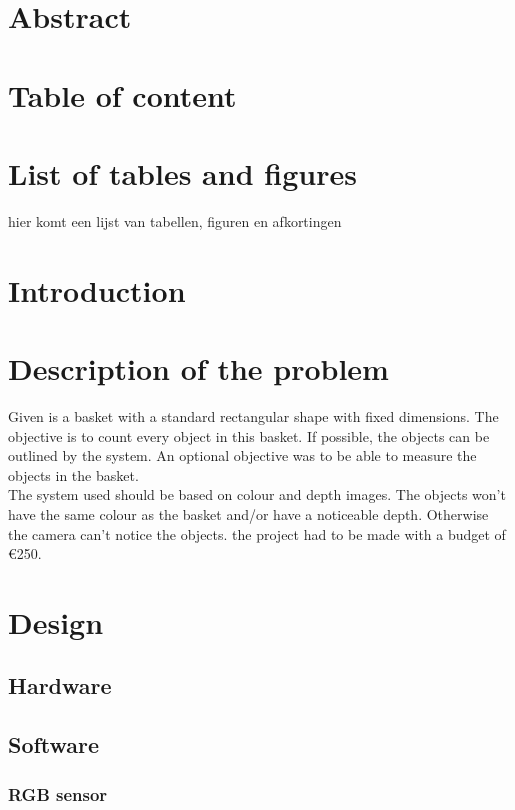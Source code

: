 \documentclass{article}
\begin{document}
\section{Abstract}

\section{Table of content}

\tableofcontents

\section{List of tables and figures}
hier komt een lijst van tabellen, figuren en afkortingen

\section{Introduction}

\section{Description of the problem}

\noindent Given is a basket with a standard rectangular shape with fixed dimensions. The objective is to count every object in this basket. If possible, the objects can be outlined by the system. An optional objective was to be able to measure the objects in the basket.\\

\noindent The system used should be based on colour and depth images. The objects won't have the same colour as the basket and/or have a noticeable depth. Otherwise the camera can't notice the objects. the project had to be made with a budget of \euro 250.


\section{Design}
\subsection{Hardware}
\subsection{Software}
\subsubsection{RGB sensor}
\end{document}
